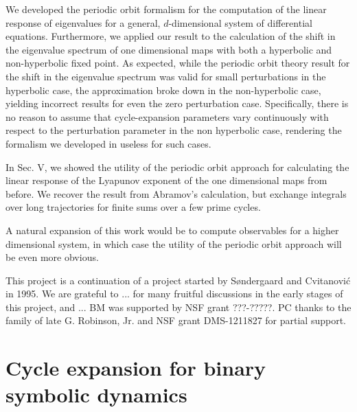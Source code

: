 \documentclass[aps,pre,
                showpacs,
                twocolumn,
                groupedaddress,
                floatfix]{revtex4-1}
\begin{document}
We developed the periodic orbit formalism for the computation of the
linear response of eigenvalues for a general, $d$-dimensional system of
differential equations. Furthermore, we applied our result to the
calculation of the shift in the eigenvalue spectrum of one dimensional
maps with both a hyperbolic and non-hyperbolic fixed point. As expected,
while the periodic orbit theory result for the shift in the eigenvalue
spectrum was valid for small perturbations in the hyperbolic case, the
approximation broke down in the non-hyperbolic case, yielding incorrect
results for even the zero perturbation case. Specifically, there is no
reason to assume that cycle-expansion parameters vary continuously with
respect to the perturbation parameter in the non hyperbolic case,
rendering the formalism we developed in  useless for such cases.

In Sec. V, we showed the utility of the periodic orbit approach for
calculating the linear response of the Lyapunov exponent of the one
dimensional maps from before. We recover the result from Abramov's
calculation, but exchange integrals over long trajectories for finite
sums over a few prime cycles.

A natural expansion of this work would be to compute observables for a
higher dimensional system, in which case the utility of the periodic
orbit approach will be even more obvious.

\begin{acknowledgments}
This project is a continuation of a project started by S{\o}ndergaard and
Cvitanovi\'c in 1995.
We are grateful to ... for many fruitful discussions in
the early stages of this project, and ...
BM was supported by NSF grant ???-?????.
PC thanks to the family of late G. Robinson, Jr. and NSF grant
DMS-1211827 for partial support.
\end{acknowledgments}

\appendix
\section{Cycle expansion for binary symbolic dynamics}
\label{appe:cyclBinarySymbolic}
\end{document}
